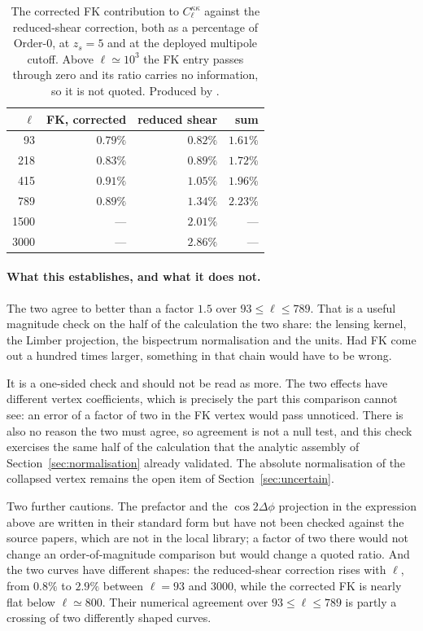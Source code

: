 \begin{table}[h]
\centering
\begin{tabular}{rrrr}
\toprule
$\ell$ & FK, corrected & reduced shear & sum \\
\midrule
   93 & $0.79\%$ & $0.82\%$ & $1.61\%$ \\
  218 & $0.83\%$ & $0.89\%$ & $1.72\%$ \\
  415 & $0.91\%$ & $1.05\%$ & $1.96\%$ \\
  789 & $0.89\%$ & $1.34\%$ & $2.23\%$ \\
 1500 & ---      & $2.01\%$ & --- \\
 3000 & ---      & $2.86\%$ & --- \\
\bottomrule
\end{tabular}
\caption{The corrected FK contribution to $C_\ell^{\kappa\kappa}$ against
the reduced-shear correction, both as a percentage of Order-0, at $z_s=5$
and at the deployed multipole cutoff. Above $\ell\simeq10^3$ the FK entry
passes through zero and its ratio carries no information, so it is not
quoted. Produced by .}
\label{tab:reducedshear}
\end{table}

\paragraph{What this establishes, and what it does not.} The two agree to
better than a factor $1.5$ over $93\le\ell\le789$. That is a useful
magnitude check on the half of the calculation the two share: the lensing
kernel, the Limber projection, the bispectrum normalisation and the units.
Had FK come out a hundred times larger, something in that chain would have
to be wrong.

It is a one-sided check and should not be read as more. The two effects have
different vertex coefficients, which is precisely the part this comparison
cannot see: an error of a factor of two in the FK vertex would pass
unnoticed. There is also no reason the two must agree, so agreement is not
a null test, and this check exercises the same half of the calculation that
the analytic assembly of Section~\ref{sec:normalisation} already validated.
The absolute normalisation of the collapsed vertex remains the open item of
Section~\ref{sec:uncertain}.

Two further cautions. The prefactor and the $\cos2\Delta\phi$ projection in
the expression above are written in their standard form but have not been
checked against the source papers, which are not in the local library; a
factor of two there would not change an order-of-magnitude comparison but
would change a quoted ratio. And the two curves have different shapes: the
reduced-shear correction rises with $\ell$, from $0.8\%$ to $2.9\%$ between
$\ell=93$ and $3000$, while the corrected FK is nearly flat below
$\ell\simeq800$. Their numerical agreement over $93\le\ell\le789$ is partly
a crossing of two differently shaped curves.

